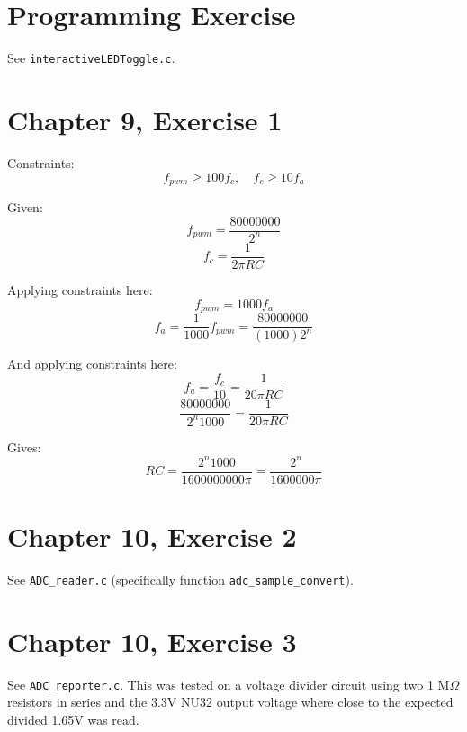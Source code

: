 \documentclass[12pt]{article}
\begin{document}
\section*{Programming Exercise}
See \verb|interactiveLEDToggle.c|.

\section*{Chapter 9, Exercise 1}
Constraints: 
\[f_{pwm} \ge 100 f_c, \quad f_c \ge 10 f_a\]

Given:
\[f_{pwm} = \frac{80000000}{2^n}\]
\[f_c = \frac{1}{2 \pi R C}\]

Applying constraints here:
\[f_{pwm} = 1000 f_{a}\]
\[f_{a} = \frac{1}{1000}f_{pwm} = \frac{80000000}{(1000) 2^n}\]

And applying constraints here:
\[f_a = \frac{f_c}{10} = \frac{1}{20 \pi RC}\]
\[\frac{80000000}{2^n 1000} = \frac{1}{20 \pi RC}\]

Gives:
\[RC = \frac{2^n 1000}{1600000000 \pi} = \frac{2^n}{1600000 \pi}\]


\section*{Chapter 10, Exercise 2}
See \verb|ADC_reader.c| (specifically function \verb|adc_sample_convert|).

\section*{Chapter 10, Exercise 3}
See \verb|ADC_reporter.c|.
This was tested on a voltage divider circuit using two 1 M$\Omega$ resistors in series and the 3.3V NU32 output voltage where close to the expected divided 1.65V was read.
    
\end{document}
